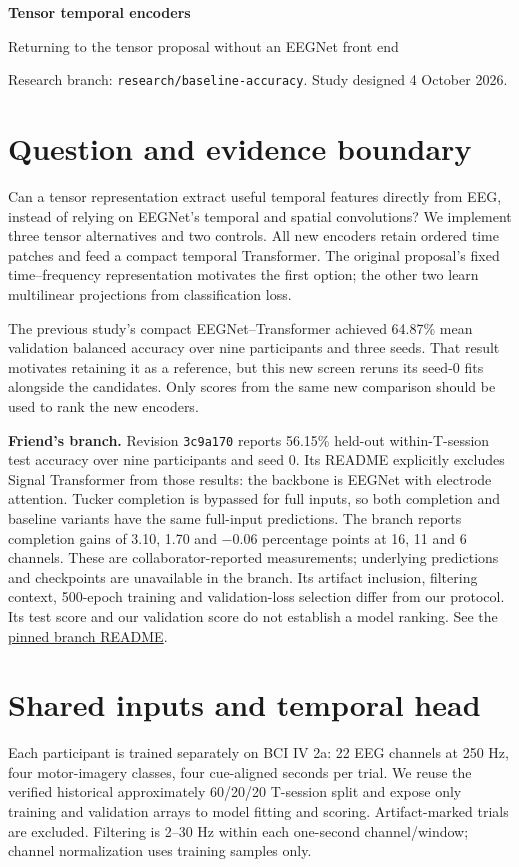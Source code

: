 \documentclass[11pt,a4paper]{article}
\newcommand{\code}[1]{{\small\nolinkurl{#1}}}
\begin{document}
{\LARGE\bfseries\color{navy} Tensor temporal encoders}\par
{\large Returning to the tensor proposal without an EEGNet front end}\par
Research branch: \code{research/baseline-accuracy}. Study designed 4 October 2026.

\section{Question and evidence boundary}
Can a tensor representation extract useful temporal features directly from EEG,
instead of relying on EEGNet's temporal and spatial convolutions? We implement
three tensor alternatives and two controls. All new encoders retain ordered
time patches and feed a compact temporal Transformer. The original proposal's
fixed time--frequency representation motivates the first option; the other two
learn multilinear projections from classification loss.

The previous study's compact EEGNet--Transformer achieved 64.87\% mean
validation balanced accuracy over nine participants and three seeds. That result
motivates retaining it as a reference, but this new screen reruns its seed-0
fits alongside the candidates. Only scores from the same new comparison should
be used to rank the new encoders.

\textbf{Friend's branch.} Revision \code{3c9a170} reports 56.15\% held-out
within-T-session test accuracy over nine participants and seed 0. Its README
explicitly excludes Signal Transformer from those results: the backbone is
EEGNet with electrode attention. Tucker completion is bypassed for full inputs,
so both completion and baseline variants have the same full-input predictions.
The branch reports completion gains of 3.10, 1.70 and $-0.06$ percentage points
at 16, 11 and 6 channels. These are collaborator-reported measurements;
underlying predictions and checkpoints are unavailable in the branch.
Its artifact inclusion, filtering context, 500-epoch training and validation-loss
selection differ from our protocol. Its test score and our validation score do
not establish a model ranking. See the
\href{https://github.com/georgiipr/agfl-inm/blob/3c9a170/README.md}{pinned branch README}.

\section{Shared inputs and temporal head}
Each participant is trained separately on BCI IV 2a: 22 EEG channels at 250 Hz,
four motor-imagery classes, four cue-aligned seconds per trial. We reuse the
verified historical approximately 60/20/20 T-session split and expose only
training and validation arrays to model fitting and scoring. Artifact-marked
trials are excluded. Filtering is 2--30 Hz within each one-second channel/window;
channel normalization uses training samples only.
\end{document}
